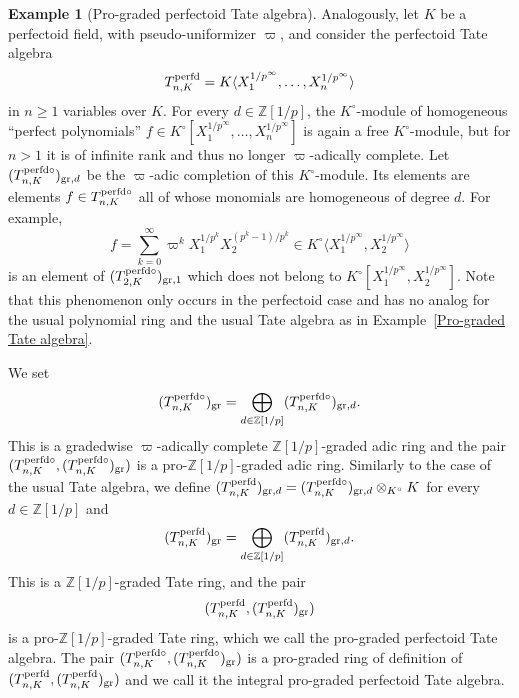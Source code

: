 \documentclass[12pt,twoside,a4paper]{article}
\theoremstyle{definition}
\newtheorem{example}[thm]{Example}
\theoremstyle{remark}
\newcommand\gr{{\rm gr}}
\newcommand\perfd{{\rm perfd}}
\begin{document}
\begin{example}[Pro-graded perfectoid Tate algebra]\label{Pro-graded perfectoid Tate algebra}Analogously, let $K$ be a perfectoid field, with pseudo-uniformizer $\varpi$, and consider the perfectoid Tate algebra \begin{equation*}T_{n, K}^{\perfd}=K\langle X_{1}^{1/p^{\infty}},\dots, X_{n}^{1/p^{\infty}}\rangle\end{equation*}in $n\geq1$ variables over $K$. For every $d\in \mathbb{Z}[1/p]$, the $K^{\circ}$-module of homogeneous ``perfect polynomials'' $f\in K^{\circ}[X_{1}^{1/p^{\infty}},\dots, X_{n}^{1/p^{\infty}}]$ is again a free $K^{\circ}$-module, but for $n>1$ it is of infinite rank and thus no longer $\varpi$-adically complete. Let $(T_{n, K}^{\perfd\circ})_{\gr, d}$ be the $\varpi$-adic completion of this $K^{\circ}$-module. Its elements are elements $f\in T_{n, K}^{\perfd\circ}$ all of whose monomials are homogeneous of degree $d$. For example, \begin{equation*}f=\sum_{k=0}^{\infty}\varpi^{k}X_{1}^{1/p^{k}}X_{2}^{(p^{k}-1)/p^{k}}\in K^{\circ}\langle X_{1}^{1/p^{\infty}}, X_{2}^{1/p^{\infty}}\rangle \end{equation*}is an element of $(T_{2, K}^{\perfd\circ})_{\gr, 1}$ which does not belong to $K^{\circ}[X_{1}^{1/p^{\infty}}, X_{2}^{1/p^{\infty}}]$. Note that this phenomenon only occurs in the perfectoid case and has no analog for the usual polynomial ring and the usual Tate algebra as in Example~\ref{Pro-graded Tate algebra}.

We set \begin{equation*}(T_{n, K}^{\perfd\circ})_{\gr}=\bigoplus_{d\in\mathbb{Z}[1/p]}(T_{n, K}^{\perfd\circ})_{\gr, d}.\end{equation*}This is a gradedwise $\varpi$-adically complete $\mathbb{Z}[1/p]$-graded adic ring and the pair $(T_{n, K}^{\perfd\circ}, (T_{n, K}^{\perfd\circ})_{\gr})$ is a pro-$\mathbb{Z}[1/p]$-graded adic ring. Similarly to the case of the usual Tate algebra, we define $(T_{n, K}^{\perfd})_{\gr, d}=(T_{n, K}^{\perfd\circ})_{\gr, d}\otimes_{K^{\circ}}K$ for every $d\in\mathbb{Z}[1/p]$ and \begin{equation*}(T_{n, K}^{\perfd})_{\gr}=\bigoplus_{d\in\mathbb{Z}[1/p]}(T_{n, K}^{\perfd})_{\gr, d}.\end{equation*}This is a $\mathbb{Z}[1/p]$-graded Tate ring, and the pair \begin{equation*}(T_{n, K}^{\perfd}, (T_{n, K}^{\perfd})_{\gr})\end{equation*}is a pro-$\mathbb{Z}[1/p]$-graded Tate ring, which we call the pro-graded perfectoid Tate algebra. The pair $(T_{n, K}^{\perfd\circ}, (T_{n, K}^{\perfd\circ})_{\gr})$ is a pro-graded ring of definition of $(T_{n, K}^{\perfd}, (T_{n, K}^{\perfd})_{\gr})$ and we call it the integral pro-graded perfectoid Tate algebra.\end{example}
\end{document}
